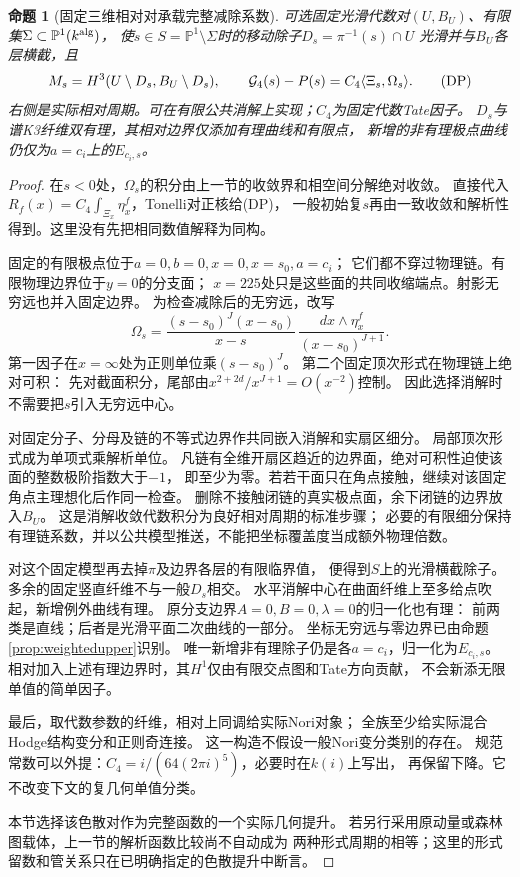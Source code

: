 \documentclass[11pt,a4paper]{ctexart}
\theoremstyle{cnplain}\newtheorem{theorem}{定理}[section]
\newtheorem{proposition}[theorem]{命题}
\theoremstyle{definition}\newtheorem{definition}[theorem]{定义}
\theoremstyle{remark}\newtheorem{remark}[theorem]{注}
\begin{document}
\begin{proposition}[固定三维相对对承载完整减除系数]\label{prop:dispersionpair}
可选固定光滑代数对$(U,B_U)$、有限集$\Sigma\subset\mathbb P^1(k^{\rm alg})$，
使$s\in S=\mathbb P^1\setminus\Sigma$时的移动除子$D_s=\pi^{-1}(s)\cap U$
光滑并与$B_U$各层横截，且
\[
 M_s=H^3(U\setminus D_s,B_U\setminus D_s),\qquad
 {\cal G}_4(s)-P(s)=C_4\langle\Xi_s,\Omega_s\rangle .
 \tag{DP}\label{eq:dispersionpair}
\]
右侧是实际相对周期。可在有限公共消解上实现；$C_4$为固定代数Tate因子。
$D_s$与谱K3纤维双有理，其相对边界仅添加有理曲线和有限点，
新增的非有理极点曲线仍仅为$a=c_i$上的$E_{c_i,s}$。
\end{proposition}
\begin{proof}
在$s<0$处，$\Omega_s$的积分由上一节的收敛界和相空间分解绝对收敛。
直接代入$R_f(x)=C_4\int_{\Xi_x}\eta_x^f$，Tonelli对正核给(DP)，
一般初始复$s$再由一致收敛和解析性得到。这里没有先把相同数值解释为同构。

固定的有限极点位于$a=0,b=0,x=0,x=s_0,a=c_i$；
它们都不穿过物理链。有限物理边界位于$y=0$的分支面；
$x=225$处只是这些面的共同收缩端点。射影无穷远也并入固定边界。
为检查减除后的无穷远，改写
\[
 \Omega_s=
 \frac{(s-s_0)^J(x-s_0)}{x-s}\,
 \frac{dx\wedge\eta_x^f}{(x-s_0)^{J+1}} .
\]
第一因子在$x=\infty$处为正则单位乘$(s-s_0)^J$。
第二个固定顶次形式在物理链上绝对可积：
先对截面积分，尾部由$x^{2+2d}/x^{J+1}=O(x^{-2})$控制。
因此选择消解时不需要把$s$引入无穷远中心。

对固定分子、分母及链的不等式边界作共同嵌入消解和实扇区细分。
局部顶次形式成为单项式乘解析单位。
凡链有全维开扇区趋近的边界面，绝对可积性迫使该面的整数极阶指数大于$-1$，
即至少为零。若若干面只在角点接触，继续对该固定角点主理想化后作同一检查。
删除不接触闭链的真实极点面，余下闭链的边界放入$B_U$。
这是消解收敛代数积分为良好相对周期的标准步骤；
必要的有限细分保持有理链系数，并以公共模型推送，不能把坐标覆盖度当成额外物理倍数。

对这个固定模型再去掉$\pi$及边界各层的有限临界值，
便得到$S$上的光滑横截除子。多余的固定竖直纤维不与一般$D_s$相交。
水平消解中心在曲面纤维上至多给点吹起，新增例外曲线有理。
原分支边界$A=0,B=0,\lambda=0$的归一化也有理：
前两类是直线；后者是光滑平面二次曲线的一部分。
坐标无穷远与零边界已由命题\ref{prop:weightedupper}识别。
唯一新增非有理除子仍是各$a=c_i$，归一化为$E_{c_i,s}$。
相对加入上述有理边界时，其$H^1$仅由有限交点图和Tate方向贡献，
不会新添无限单值的简单因子。

最后，取代数参数的纤维，相对上同调给实际Nori对象；
全族至少给实际混合Hodge结构变分和正则奇连接。
这一构造不假设一般Nori变分类别的存在。
规范常数可以外提：$C_4=i/(64(2\pi i)^5)$，必要时在$k(i)$上写出，
再保留下降。它不改变下文的复几何单值分类。

本节选择该色散对作为完整函数的一个实际几何提升。
若另行采用原动量或森林图载体，上一节的解析函数比较尚不自动成为
两种形式周期的相等；这里的形式留数和管关系只在已明确指定的色散提升中断言。
\end{proof}
\end{document}
